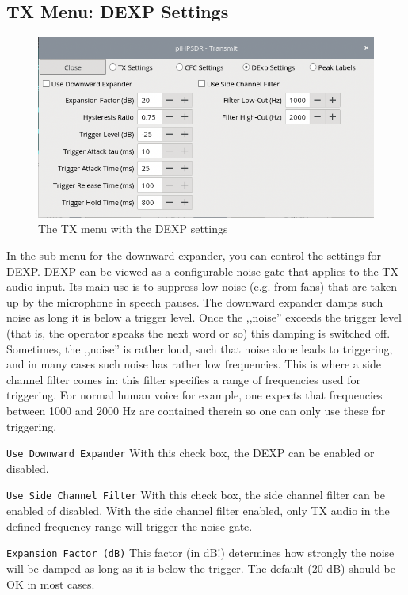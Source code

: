 \documentclass[12pt]{book}
\def\rett#1{\texttt{\color{red}#1}}
\begin{document}
\subsection{TX Menu: DEXP Settings}

\begin{figure}[ht]
\center
\includegraphics[scale=0.45]{TX_DEXP.png}
\caption{The TX menu with the DEXP settings}
\label{fig:DEXPmenu}
\end{figure}

In the sub-menu for the downward expander, you can control the settings for DEXP. DEXP can be viewed
as a configurable noise gate that applies to the TX audio input. Its main use is to suppress low noise
(e.g. from fans) that are taken up  by the microphone in speech pauses. The downward expander damps
such noise as long it is below a trigger level. Once the ,,noise'' exceeds the trigger level (that is,
the  operator speaks the next word or so) this damping is switched off. Sometimes, the ,,noise'' is
rather loud, such that noise alone leads to triggering, and in many cases such noise has rather low
frequencies. This is where a side channel filter comes in: this filter specifies a range of frequencies
used for triggering. For normal human voice for example, one expects that frequencies between 1000 and
2000 Hz are contained therein so one can only use these for triggering.

\rett{Use Downward Expander} With this check box, the DEXP can be enabled or disabled.

\rett{Use Side Channel Filter} With this check box, the side channel filter can be enabled of disabled.
With the  side channel filter enabled, only TX audio in the defined frequency  range will trigger the
noise gate.

\rett{Expansion Factor (dB)} This factor (in dB!) determines how strongly the noise will be damped as long
as it is below the trigger. The default (20 dB) should be OK in most cases.
\end{document}
